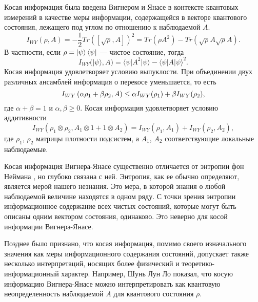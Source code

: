 Косая информация\cite{Wigner1963} была введена Вигнером и Янасе
в контексте квантовых измерений в качестве меры информации,
содержащейся в векторе квантового состояния, лежащего под углом по отношению к наблюдаемой $A$.
%
\begin{equation}\label{eq:wyi}
  I_{WY}(\rho, A)
  = -\frac{1}{2} Tr([\sqrt{\rho}, A])^2
  = Tr(\rho A^2) - Tr(\sqrt \rho A \sqrt \rho  A ).
\end{equation}
%
В частности, если $\rho = \left| \psi \right\rangle\left\langle \psi \right|$ --- чистое состояние, тогда
%
\begin{equation}\label{eq:wyi-pure}
  I_{WY}(| \psi \rangle, A)
  = \langle \psi | A^2 | \psi \rangle - \langle \psi | A| \psi \rangle ^2.
\end{equation}
Косая информация удовлетворяет условию выпуклости.
При объединении двух различных ансамблей информация о перекосе уменьшается, то есть
%
\begin{equation}\label{eq:wyi-convex}
  I_{WY}\left( \alpha \rho_1 + \beta \rho_2, A \right)
  \leq \alpha I_{WY}(\rho_1) + \beta I_{WY}(\rho_2),
\end{equation}
где $\alpha + \beta = 1$ и $\alpha, \beta \geq 0$.
%
Косая информация удовлетворяет условию аддитивности
%
\begin{equation}\label{eq:wyi-additivity}
 I_{WY}(\rho_1 \otimes \rho_2, A_1 \otimes 1 + 1 \otimes A_2)
 = I_{WY}(\rho_1, A_1) + I_{WY}(\rho_2, A_2),
\end{equation}
%
где $\rho_1$, $\rho_2$ матрицы плотности подсистем,
а $A_1$, $A_2$ соответствующие локальные наблюдаемые.
%

Косая информация Вигнера-Янасе существенно отличается от энтропии фон Неймана \cite{Wigner1960, Lieb1973prl, Lieb1973, Wehrl1978},
но глубоко связана с ней.
Энтропия, как ее обычно определяют, является мерой нашего незнания\cite{Weaver1949}.
Это мера, в которой знания о любой наблюдаемой величине находятся в одном ряду.
С точки зрения энтропии информационное содержание всех чистых состояний,
которые могут быть описаны одним вектором состояния, одинаково.
Это неверно для косой информации Вигнера-Янасе.

Позднее было признано, что косая информация,
помимо своего изначального значения как меры информационного содержания состояний,
допускает также несколько интерпретаций,
носящих более физический и теоретико-информационный характер.
Например, Шунь Лун Ло показал\cite{Luo2003prl, Luo2005, Luo2005pra, Luo2006, Luo2017},
что косую информацию Вигнера-Янасе можно интерпретировать
как квантовую неопределенность наблюдаемой $A$ для квантового состояния $\rho$.

